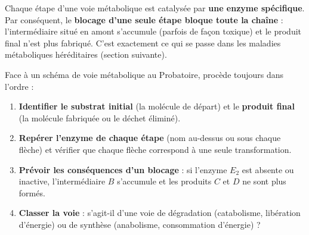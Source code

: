 \documentclass[11pt]{article}
\begin{document}
\begin{propriete}
Chaque étape d'une voie métabolique est catalysée par \textbf{une enzyme spécifique}. Par conséquent, le \textbf{blocage d'une seule étape bloque toute la chaîne} : l'intermédiaire situé en amont s'accumule (parfois de façon toxique) et le produit final n'est plus fabriqué. C'est exactement ce qui se passe dans les maladies métaboliques héréditaires (section suivante).
\end{propriete}

\begin{methode}
Face à un schéma de voie métabolique au Probatoire, procède toujours dans l'ordre :
\begin{enumerate}
\item \textbf{Identifier le substrat initial} (la molécule de départ) et le \textbf{produit final} (la molécule fabriquée ou le déchet éliminé).
\item \textbf{Repérer l'enzyme de chaque étape} (nom au-dessus ou sous chaque flèche) et vérifier que chaque flèche correspond à une seule transformation.
\item \textbf{Prévoir les conséquences d'un blocage} : si l'enzyme $E_2$ est absente ou inactive, l'intermédiaire $B$ s'accumule et les produits $C$ et $D$ ne sont plus formés.
\item \textbf{Classer la voie} : s'agit-il d'une voie de dégradation (catabolisme, libération d'énergie) ou de synthèse (anabolisme, consommation d'énergie) ?
\end{enumerate}
\end{methode}
\end{document}

